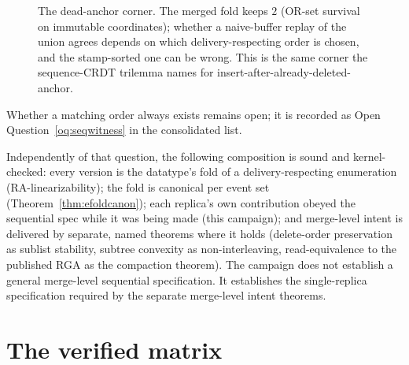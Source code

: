 \documentclass[11pt]{article}
\newcommand{\del}{\mathsf{del}}
\newcommand{\ins}{\mathsf{ins}}
\begin{document}
\begin{figure}[h]
\centering
{}
\caption{The dead-anchor corner. The merged fold keeps $2$ (OR-set
survival on immutable coordinates); whether a naive-buffer replay of
the union agrees depends on which delivery-respecting order is chosen,
and the stamp-sorted one can be wrong. This is the same corner the
sequence-CRDT trilemma names for insert-after-already-deleted-anchor.}
\label{fig:deadanchor}
\end{figure}

Whether a matching order always exists remains open; it is
recorded as Open Question~\ref{oq:seqwitness} in the consolidated
list.

Independently of that question, the following composition is sound and
kernel-checked: every version is the datatype's fold of a
delivery-respecting enumeration (RA-linearizability); the fold is
canonical per event set (Theorem~\ref{thm:efoldcanon}); each
replica's own contribution obeyed the sequential spec while it was
being made (this campaign); and merge-level intent is delivered by
separate, named theorems where it holds (delete-order preservation as
sublist stability, subtree convexity as non-interleaving,
read-equivalence to the published RGA as the compaction theorem). The
campaign does not establish a general merge-level sequential specification.
It establishes the single-replica specification required by the separate
merge-level intent theorems.

\section{The verified matrix}
\label{sec:matrix}
\end{document}
